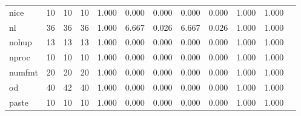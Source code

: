 \begin{longtable}{lp{1.00cm}p{1.00cm}p{1.00cm}p{1.00cm}p{1.00cm}p{1.00cm}p{1.00cm}p{1.00cm}p{1.00cm}p{1.00cm}p{1.00cm}}
nice      &                           10 &                 10 &                                10 &                                      1.000 &                                  0.000 &                                        0.000 &                             0.000 &                                   0.000 &                        1.000 &                                        1.000 \\
nl        &                           36 &                 36 &                                36 &                                      1.000 &                                  6.667 &                                        0.026 &                             6.667 &                                   0.026 &                        1.000 &                                        1.000 \\
nohup     &                           13 &                 13 &                                13 &                                      1.000 &                                  0.000 &                                        0.000 &                             0.000 &                                   0.000 &                        1.000 &                                        1.000 \\
nproc     &                           10 &                 10 &                                10 &                                      1.000 &                                  0.000 &                                        0.000 &                             0.000 &                                   0.000 &                        1.000 &                                        1.000 \\
numfmt    &                           20 &                 20 &                                20 &                                      1.000 &                                  0.000 &                                        0.000 &                             0.000 &                                   0.000 &                        1.000 &                                        1.000 \\
od        &                           40 &                 42 &                                40 &                                      1.000 &                                  0.000 &                                        0.000 &                             0.000 &                                   0.000 &                        1.000 &                                        1.000 \\
paste     &                           10 &                 10 &                                10 &                                      1.000 &                                  0.000 &                                        0.000 &                             0.000 &                                   0.000 &                        1.000 &                                        1.000 \\

\end{longtable}
